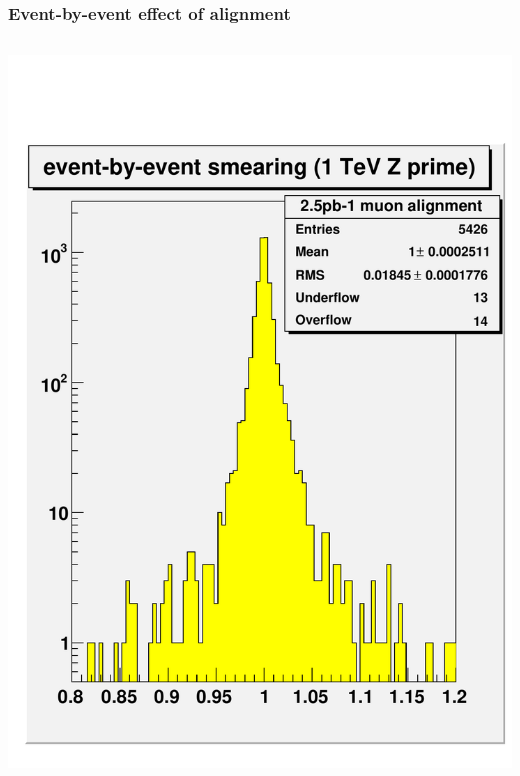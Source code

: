 \documentclass[compress]{beamer}
\begin{document}
\begin{frame}
\frametitle{Event-by-event effect of alignment}
\begin{columns}
\includegraphics[width=\linewidth]{smearing_events10k.pdf}

\end{columns}
\end{frame}
\end{document}
